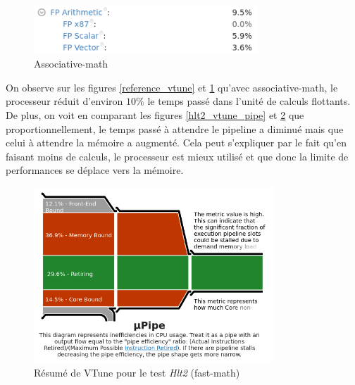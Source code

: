 \documentclass[a4paper,11pt]{report}
\begin{document}
\begin{figure}[H]
    \includegraphics[width=0.75\textwidth, center]{associative-math_vtune.png}
    \caption{Associative-math}
    \label{associative-math_vtune}
\end{figure}

On observe sur les figures \ref{reference_vtune} et \ref{associative-math_vtune} qu'avec associative-math, le processeur réduit d'environ $10\%$ le temps passé dans l'unité de calculs flottants.
De plus, on voit en comparant les figures \ref{hlt2_vtune_pipe} et \ref{fast-math_vtune_pipe} que proportionnellement, le temps passé à attendre le pipeline a diminué mais que celui à attendre la mémoire a augmenté.
Cela peut s'expliquer par le fait qu'en faisant moins de calculs, le processeur est mieux utilisé et que donc la limite de performances se déplace vers la mémoire.

\begin{figure}[H]
    \includegraphics[width=0.8\textwidth, center]{fast-math_vtune_pipe.png}
    \caption{Résumé de VTune pour le test \emph{Hlt2} (fast-math)}
    \label{fast-math_vtune_pipe}
\end{figure}
\end{document}
